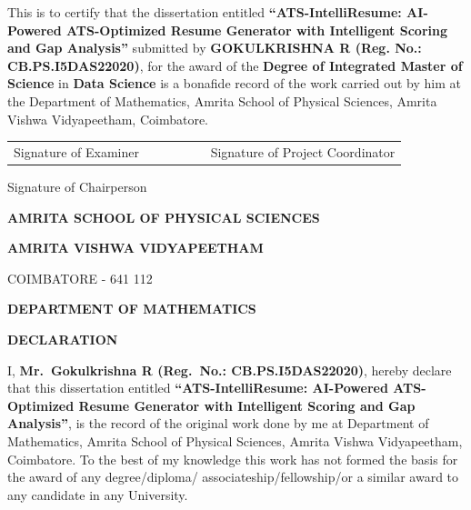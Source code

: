 \documentclass[12pt,a4paper]{report}
\begin{document}
\noindent This is to certify that the dissertation entitled
\textbf{``ATS-IntelliResume: AI-Powered ATS-Optimized Resume Generator
with Intelligent Scoring and Gap Analysis''} submitted by
\textbf{GOKULKRISHNA R (Reg. No.: CB.PS.I5DAS22020)}, for the award of
the \textbf{Degree of Integrated Master of Science} in \textbf{Data Science} is a bonafide record of the work carried out by him at the Department of
Mathematics, Amrita School of Physical Sciences, Amrita Vishwa Vidyapeetham, Coimbatore.

\vspace{3cm}
\noindent
\begin{tabular}{@{}p{0.5\linewidth} p{0.5\linewidth}@{}}
Signature of Examiner & Signature of Project Coordinator \\
\end{tabular}

\vspace{2.5cm}
\begin{center}
Signature of Chairperson
\end{center}

\newpage
\begin{center}
{\large \bfseries AMRITA SCHOOL OF PHYSICAL SCIENCES\par}
\vspace{0.3cm}
{\Large \bfseries AMRITA VISHWA VIDYAPEETHAM\par}
\vspace{0.2cm}
{\small COIMBATORE - 641 112\par}
\vspace{0.3cm}
{\large \bfseries DEPARTMENT OF MATHEMATICS\par}
\vspace{0.8cm}
{\Large \bfseries DECLARATION\par}
\end{center}
\vspace{0.5cm}

\noindent I, \textbf{Mr.\ Gokulkrishna R (Reg.\ No.: CB.PS.I5DAS22020)},
hereby declare that this dissertation entitled \textbf{``ATS-IntelliResume:
AI-Powered ATS-Optimized Resume Generator with Intelligent Scoring and
Gap Analysis''}, is the record of the original
work done by me at Department of Mathematics, Amrita School of Physical Sciences, Amrita Vishwa Vidyapeetham, Coimbatore.
To the best of my knowledge this work has not formed the basis for the award of
any degree/diploma/ associateship/fellowship/or a similar award to any candidate
in any University.
\end{document}
